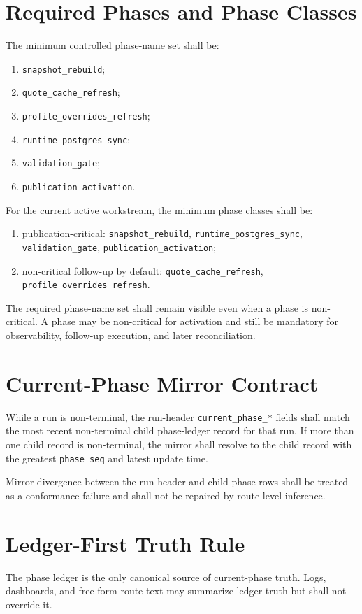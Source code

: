 \section{Required Phases and Phase Classes}
The minimum controlled phase-name set shall be:
\begin{enumerate}[leftmargin=1.2cm]
    \item \texttt{snapshot\_rebuild};
    \item \texttt{quote\_cache\_refresh};
    \item \texttt{profile\_overrides\_refresh};
    \item \texttt{runtime\_postgres\_sync};
    \item \texttt{validation\_gate};
    \item \texttt{publication\_activation}.
\end{enumerate}

For the current active workstream, the minimum phase classes shall be:
\begin{enumerate}[leftmargin=1.2cm]
    \item publication-critical: \texttt{snapshot\_rebuild}, \texttt{runtime\_postgres\_sync}, \texttt{validation\_gate}, \texttt{publication\_activation};
    \item non-critical follow-up by default: \texttt{quote\_cache\_refresh}, \texttt{profile\_overrides\_refresh}.
\end{enumerate}

The required phase-name set shall remain visible even when a phase is non-critical. A phase may be non-critical for activation and still be mandatory for observability, follow-up execution, and later reconciliation.

\section{Current-Phase Mirror Contract}
While a run is non-terminal, the run-header \texttt{current\_phase\_*} fields shall match the most recent non-terminal child phase-ledger record for that run. If more than one child record is non-terminal, the mirror shall resolve to the child record with the greatest \texttt{phase\_seq} and latest update time.

Mirror divergence between the run header and child phase rows shall be treated as a conformance failure and shall not be repaired by route-level inference.

\section{Ledger-First Truth Rule}
The phase ledger is the only canonical source of current-phase truth. Logs, dashboards, and free-form route text may summarize ledger truth but shall not override it.

